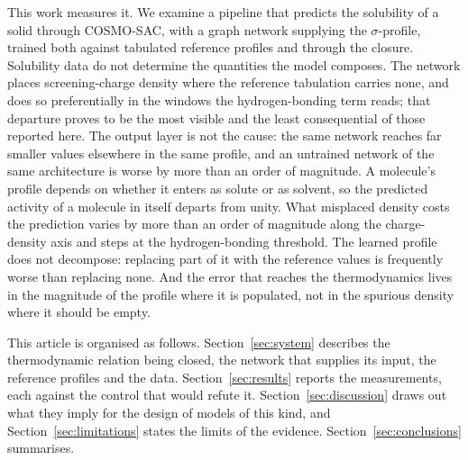This work measures it. We examine a pipeline that predicts the solubility of a solid through
COSMO-SAC, with a graph network supplying the $\sigma$-profile, trained both against tabulated
reference profiles and through the closure. Solubility data do not determine the quantities the
model composes. The network places screening-charge density where the reference tabulation carries none, and
does so preferentially in the windows the hydrogen-bonding term reads; that departure proves to
be the most visible and the least consequential of those reported here. The output layer is not the
cause: the same network reaches far smaller values elsewhere in the same profile, and an untrained
network of the same architecture is worse by more than an order of magnitude. A molecule's profile
depends on whether it enters as solute or as solvent, so the predicted activity of a molecule in
itself departs from unity. What misplaced density costs the prediction varies by more than an order
of magnitude along the charge-density axis and steps at the hydrogen-bonding threshold. The learned
profile does not decompose: replacing part of it with the reference values is frequently worse than
replacing none. And the error that reaches the thermodynamics lives in the magnitude of the profile
where it is populated, not in the spurious density where it should be empty.

This article is organised as follows. Section~\ref{sec:system} describes the thermodynamic relation
being closed, the network that supplies its input, the reference profiles and the data.
Section~\ref{sec:results} reports the measurements, each against the control that would refute it.
Section~\ref{sec:discussion} draws out what they imply for the design of models of this kind, and
Section~\ref{sec:limitations} states the limits of the evidence. Section~\ref{sec:conclusions}
summarises.
